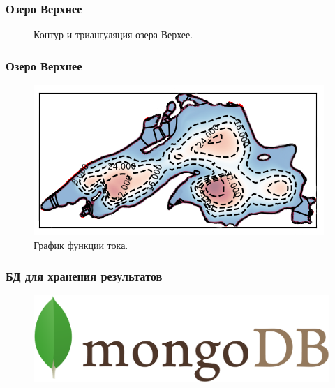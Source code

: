 \documentclass[10pt,utf8,presentation,compress]{beamer}
\begin{document}
\begin{frame}
\frametitle{Озеро Верхнее}
	\begin{figure}[H]
		\centering
		\hfill
		\caption{Контур и триангуляция озера Верхее.}
	\end{figure}
\end{frame}

\begin{frame}
\frametitle{Озеро Верхнее}
	\begin{figure}[H]
		\centering
		\includegraphics[width=0.8\linewidth]{images/ex4/psi/1}
		\caption{График функции тока.}
	\end{figure}
\end{frame}

\begin{frame}
\frametitle{БД для хранения результатов}
	\begin{figure}[H]
		\centering
		\includegraphics[width=0.8\linewidth]{images/slides/logo/mongo}
	\end{figure}
\end{frame}
\end{document}
